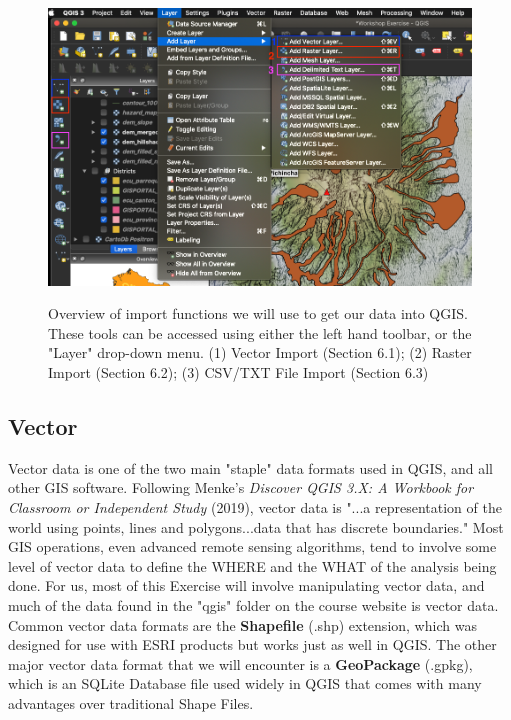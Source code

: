 \documentclass{article}
\begin{document}
\begin{figure}[htbp]
    \centering
    \includegraphics[width=\textwidth]{Fig_9_Import_Menus.png}
    \label{fig9}
    \caption{Overview of import functions we will use to get our data into QGIS. These tools can be accessed using either the left hand toolbar, or the "Layer" drop-down menu. (1) Vector Import (Section 6.1); (2) Raster Import (Section 6.2); (3) CSV/TXT File Import (Section 6.3)}
\end{figure}

\subsection{Vector}

Vector data is one of the two main "staple" data formats used in QGIS, and all other GIS software. Following Menke's \textit{Discover QGIS 3.X: A Workbook for Classroom or Independent Study} (2019), vector data is "...a representation of the world using points, lines and polygons...data that has discrete boundaries." Most GIS operations, even advanced remote sensing algorithms, tend to involve some level of vector data to define the WHERE and the WHAT of the analysis being done. For us, most of this Exercise will involve manipulating vector data, and much of the data found in the "qgis" folder on the course website is vector data. Common vector data formats are the \textbf{Shapefile} (.shp) extension, which was designed for use with ESRI products but works just as well in QGIS. The other major vector data format that we will encounter is a \textbf{GeoPackage} (.gpkg), which is an SQLite Database file used widely in QGIS that comes with many advantages over traditional Shape Files. 
\end{document}
